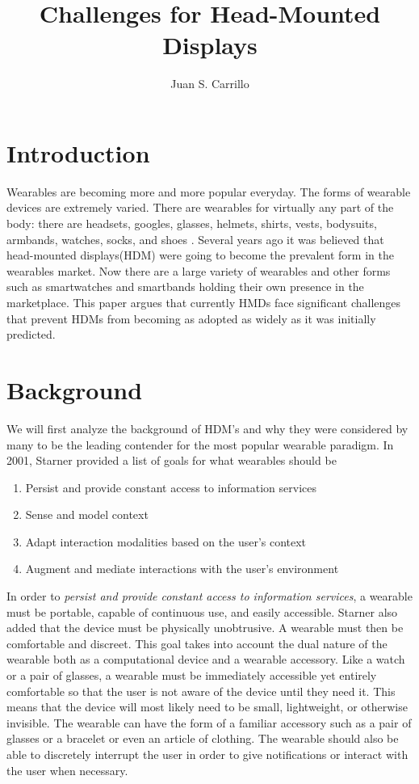\documentclass[11pt]{article}
\title{Challenges for Head-Mounted Displays}
\author{Juan S. Carrillo}
\begin{document}
\maketitle
\section{Introduction}
Wearables are becoming more and more popular everyday. The forms of wearable devices are extremely varied. There are wearables for virtually any part of the body: there are headsets, googles, glasses, helmets, shirts, vests, bodysuits, armbands, watches, socks, and shoes \cite{VandricoList}. Several years ago it was believed that head-mounted displays(HDM) were going to become the prevalent form in the wearables market\cite{ultimateWearable}. Now there are a large variety of wearables and other forms such as smartwatches and smartbands holding their own presence in the marketplace. This paper argues that currently HMDs face significant challenges that prevent HDMs from becoming as adopted as widely as it was initially predicted.

\section{Background}
We will first analyze the background of HDM's and why they were considered by many to be the leading contender for the most popular wearable paradigm. In 2001, Starner provided a list of goals for what wearables should be
\begin{enumerate}
    \item Persist and provide constant access to information services
    \item Sense and model context
    \item Adapt interaction modalities based on the user's context
    \item Augment and mediate interactions with the user's environment
\end{enumerate}

In order to \textit{persist and provide constant access to information services}, a wearable must be portable, capable of continuous use, and easily accessible. Starner also added that the device must be physically unobtrusive. A wearable must then be comfortable and discreet. This goal takes into account the dual nature of the wearable both as a computational device and a wearable accessory. Like a watch or a pair of glasses, a wearable must be immediately accessible yet entirely comfortable so that the user is not aware of the device until they need it.  This means that the device will most likely need to be small, lightweight, or otherwise invisible. The wearable can have the form of a familiar accessory such as a pair of glasses or a bracelet or even an article of clothing. The wearable should also be able to discretely interrupt the user in order to give notifications or interact with the user when necessary.
\end{document}
